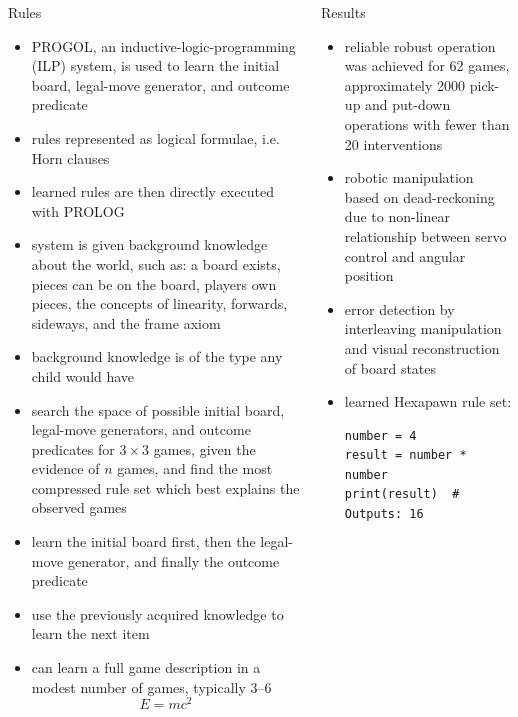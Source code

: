 \documentclass[final,t]{beamer}
\begin{document}
\begin{frame}[fragile]{}
\begin{columns}[t]
\begin{column}{.3\linewidth}
      \begin{block}{Rules}
	\begin{itemize}
	\item PROGOL, an inductive-logic-programming (ILP) system, is used
	  to learn the initial board, legal-move generator, and outcome
	  predicate
	\item rules represented as logical formulae, i.e. Horn clauses
	\item learned rules are then directly executed with PROLOG
	\item system is given background knowledge about the world,
	  such as: a board exists, pieces can be on the board, players
	  own pieces, the concepts of linearity, forwards, sideways,
	  and the frame axiom
	\item background knowledge is of the type any child would have
	\item search the space of possible initial board, legal-move
	  generators, and outcome predicates for $3\times3$ games, given
	  the evidence of $n$ games, and find the most compressed rule
	  set which best explains the observed games
	\item learn the initial board first, then the legal-move
	  generator, and finally the outcome predicate
	\item use the previously acquired knowledge to learn the next
	  item
	\item can learn a full game description in a modest number of games, typically 3--6
	\[
		E = mc^2
	\]
	\end{itemize}
      \end{block}
    \end{column}

    \begin{column}{.3\linewidth}
      \begin{block}{Results}
	\begin{itemize}
	\item reliable robust operation was achieved for 62 games,
	  approximately 2000 pick-up and put-down operations with
	  fewer than 20 interventions
	\item robotic manipulation based on dead-reckoning due to
	  non-linear relationship between servo control and angular position
	\item error detection by interleaving manipulation and visual
	  reconstruction of board states
	\item learned Hexapawn rule set:\\
	\begin{verbatim}
number = 4
result = number * number
print(result)  # Outputs: 16


\end{verbatim}
\end{itemize}
\end{block}
\end{column}
\end{columns}
\end{frame}
\end{document}
